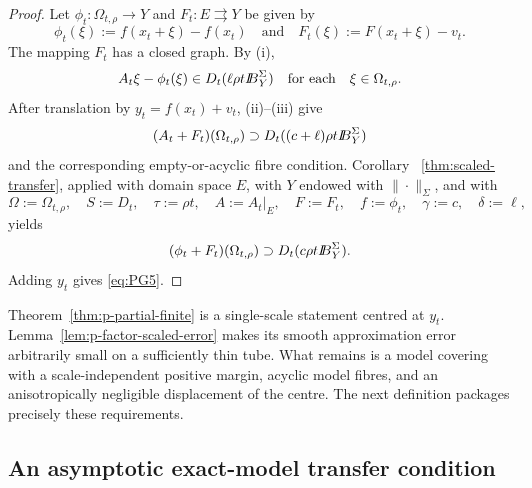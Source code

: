 \documentclass[11pt]{amsart}
\theoremstyle{definition}
\theoremstyle{remark}
\newcommand{\tto}{\rightrightarrows}
\def\ball{{I\kern -.35em B}}
\begin{document}
	\begin{proof}
		Let $\phi_t:\Omega_{t,\rho}\longrightarrow Y$ and $F_t:E\tto Y$ be given by
		$$
		\phi_t(\xi):=f(x_t+\xi)-f(x_t)
		\quad\text{and}\quad
		F_t(\xi):=F(x_t+\xi)-v_t.
		$$
		The mapping $F_t$ has a closed graph.
		By {\rm (i)},
		$$
		A_t\xi-\phi_t(\xi)
		\in D_t(\ell\rho t\ball_Y^\Sigma)
		\quad\text{for each}\quad\xi\in\Omega_{t,\rho}.
		$$
		After translation by $y_t=f(x_t)+v_t$, {\rm (ii)}--{\rm (iii)} give
		$$
		(A_t+F_t)(\Omega_{t,\rho})
		\supset D_t((c+\ell)\rho t\ball_Y^\Sigma)
		$$
		and the corresponding empty-or-acyclic fibre condition. Corollary~%
		\ref{thm:scaled-transfer}, applied with domain space $E$, with $Y$ endowed
		with $\|\cdot\|_\Sigma$, and with
		$$
		\Omega:=\Omega_{t,\rho},\quad S:=D_t,\quad \tau:=\rho t,\quad
		A:=A_t\vert_E,\quad F:=F_t,\quad f:=\phi_t,\quad
		\gamma:=c,\quad\delta:=\ell,
		$$
		yields
		$$
		(\phi_t+F_t)(\Omega_{t,\rho})
		\supset D_t(c\rho t\ball_Y^\Sigma).
		$$
		Adding $y_t$ gives \eqref{eq:PG5}.
	\end{proof}
	
	Theorem~\ref{thm:p-partial-finite} is a single-scale statement centred
	at $y_t$. Lemma~\ref{lem:p-factor-scaled-error} makes its smooth
	approximation error arbitrarily small on a sufficiently thin tube. What
	remains is a model covering with a scale-independent positive margin,
	acyclic model fibres, and an anisotropically negligible displacement of
	the centre. The next definition packages precisely these requirements.
	
	\subsection{An asymptotic exact-model transfer condition}
	
\end{document}
